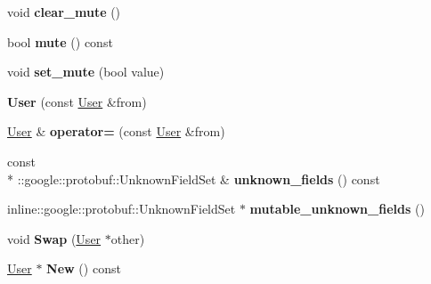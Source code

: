 \begin{DoxyCompactItemize}
\item 
\hypertarget{classSimpleChat_1_1User_ac0ae8cf95c70f0feae09dca283731d0a}{void {\bfseries clear\-\_\-mute} ()}\label{classSimpleChat_1_1User_ac0ae8cf95c70f0feae09dca283731d0a}

\item 
\hypertarget{classSimpleChat_1_1User_a5ee0fca06bd244943d6df037061cbe65}{bool {\bfseries mute} () const }\label{classSimpleChat_1_1User_a5ee0fca06bd244943d6df037061cbe65}

\item 
\hypertarget{classSimpleChat_1_1User_acfc6dcd5e75e732aada78bc551417d65}{void {\bfseries set\-\_\-mute} (bool value)}\label{classSimpleChat_1_1User_acfc6dcd5e75e732aada78bc551417d65}

\item 
\hypertarget{classSimpleChat_1_1User_af9d0c6966cc6131f24f689a2bb375562}{{\bfseries User} (const \hyperlink{classSimpleChat_1_1User}{User} \&from)}\label{classSimpleChat_1_1User_af9d0c6966cc6131f24f689a2bb375562}

\item 
\hypertarget{classSimpleChat_1_1User_aa62b1c0d29848bd524e819e174ea1b1d}{\hyperlink{classSimpleChat_1_1User}{User} \& {\bfseries operator=} (const \hyperlink{classSimpleChat_1_1User}{User} \&from)}\label{classSimpleChat_1_1User_aa62b1c0d29848bd524e819e174ea1b1d}

\item 
\hypertarget{classSimpleChat_1_1User_a74b47afc5050689cd12f8636d4a810cb}{const \\*
\-::google\-::protobuf\-::\-Unknown\-Field\-Set \& {\bfseries unknown\-\_\-fields} () const }\label{classSimpleChat_1_1User_a74b47afc5050689cd12f8636d4a810cb}

\item 
\hypertarget{classSimpleChat_1_1User_a89dd64bea6c553f3f803dab24a574acf}{inline\-::google\-::protobuf\-::\-Unknown\-Field\-Set $\ast$ {\bfseries mutable\-\_\-unknown\-\_\-fields} ()}\label{classSimpleChat_1_1User_a89dd64bea6c553f3f803dab24a574acf}

\item 
\hypertarget{classSimpleChat_1_1User_a7f64a6a4a7822d6a4d6dd8c3bc50132f}{void {\bfseries Swap} (\hyperlink{classSimpleChat_1_1User}{User} $\ast$other)}\label{classSimpleChat_1_1User_a7f64a6a4a7822d6a4d6dd8c3bc50132f}

\item 
\hypertarget{classSimpleChat_1_1User_ad6f7d285ea1db8b4d75de142f2b218e1}{\hyperlink{classSimpleChat_1_1User}{User} $\ast$ {\bfseries New} () const }\label{classSimpleChat_1_1User_ad6f7d285ea1db8b4d75de142f2b218e1}


\end{DoxyCompactItemize}
